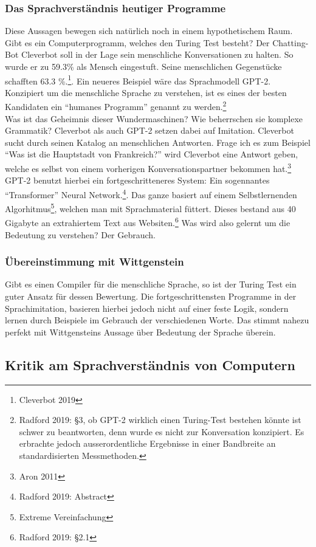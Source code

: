 \documentclass[10pt,a4paper]{article}
\begin{document}
\subsubsection{Das Sprachverständnis heutiger Programme}
Diese Aussagen bewegen sich natürlich noch in einem hypothetischem Raum. Gibt es ein Computerprogramm, welches den Turing Test besteht? Der Chatting-Bot Cleverbot soll in der Lage sein menschliche Konversationen zu halten. So wurde er zu 59.3\% als Mensch eingestuft. Seine menschlichen Gegenstücke schafften 63.3 \%.\footnote{Cleverbot 2019}. Ein neueres Beispiel wäre das Sprachmodell GPT-2. Konzipiert um die menschliche Sprache zu verstehen, ist es eines der besten Kandidaten ein \enquote{humanes Programm} genannt zu werden.\footnote{Radford 2019: §3, ob GPT-2 wirklich einen Turing-Test bestehen könnte ist schwer zu beantworten, denn wurde es nicht zur Konversation konzipiert. Es erbrachte jedoch ausserordentliche Ergebnisse in einer Bandbreite an standardisierten Messmethoden.} \\
Was ist das Geheimnis dieser Wundermaschinen? Wie beherrschen sie komplexe Grammatik? Cleverbot als auch GPT-2 setzen dabei auf Imitation. Cleverbot sucht durch seinen Katalog an menschlichen Antworten. Frage ich es zum Beispiel \enquote{Was ist die Hauptstadt von Frankreich?} wird Cleverbot eine Antwort geben, welche es selbst von einem vorherigen Konversationspartner bekommen hat.\footnote{Aron 2011} GPT-2 benutzt hierbei ein fortgeschritteneres System: Ein sogennantes \enquote{Transformer} Neural Network.\footnote{Radford 2019: Abstract}. Das ganze basiert auf einem Selbstlernenden Algorhitmus\footnote{Extreme Vereinfachung}, welchen man mit Sprachmaterial füttert. Dieses bestand aus 40 Gigabyte an extrahiertem Text aus Websiten.\footnote{Radford 2019: §2.1} Was wird also gelernt um die Bedeutung zu verstehen? Der Gebrauch.

\subsubsection{Übereinstimmung mit Wittgenstein}
Gibt es einen Compiler für die menschliche Sprache, so ist der Turing Test ein guter Ansatz für dessen Bewertung. Die fortgeschrittensten Programme in der Sprachimitation, basieren hierbei jedoch nicht auf einer feste Logik, sondern lernen durch Beispiele im Gebrauch der verschiedenen Worte. Das stimmt nahezu perfekt mit Wittgensteins Aussage über Bedeutung der Sprache überein.

\subsection{Kritik am Sprachverständnis von Computern}
\end{document}
